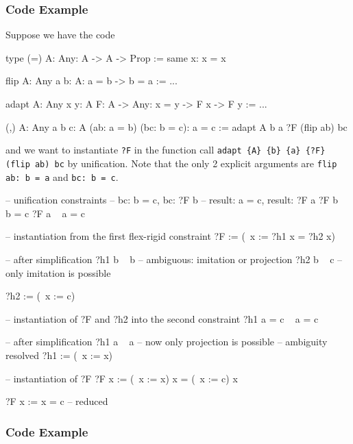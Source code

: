 \subsubsection{Code Example}

Suppose we have the code
\begin{alba}
    type (=) {A: Any}: A -> A -> Prop :=
        same {x}: x = x

    flip {A: Any} {a b: A}: a = b -> b = a :=
        ...

    adapt {A: Any} {x y: A} {F: A -> Any}: x = y -> F x -> F y :=
        ...

    (,) {A: Any} {a b c: A} (ab: a = b) (bc: b = c): a = c :=
        adapt {A} {b} {a} {?F} (flip ab) bc
\end{alba}
%
and we want to instantiate {\tt ?F} in the function call
{\tt adapt \{A\} \{b\} \{a\} \{?F\} (flip ab) bc}
by unification. Note that the only 2 explicit arguments are
{\tt flip ab: b = a} and {\tt bc: b = c}.

\begin{alba}
    -- unification constraints
    --    bc: b = c,      bc: ?F b
    --    result: a = c,  result: ?F a
    ?F b   ~   b = c
    ?F a   ~   a = c

    -- instantiation from the first flex-rigid constraint
    ?F := (\ x := ?h1 x = ?h2 x)

    -- after simplification
    ?h1 b  ~  b             -- ambiguous: imitation or projection
    ?h2 b  ~  c             -- only imitation is possible

    ?h2 := (\ x := c)

    -- instantiation of ?F and ?h2 into the second constraint
    ?h1 a = c    ~    a = c

    -- after simplification
    ?h1 a  ~  a             -- now only projection is possible
                            -- ambiguity resolved
    ?h1 := (\ x := x)

    -- instantiation of ?F
    ?F x := (\ x := x) x = (\ x := c) x

    ?F x := x = c   -- reduced
\end{alba}






\subsubsection{Code Example}



